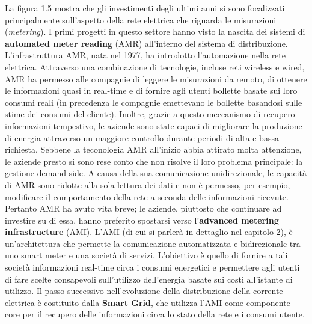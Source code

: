 La figura 1.5 mostra che gli investimenti degli ultimi anni si sono focalizzati principalmente sull'aspetto della rete elettrica che riguarda le misurazioni (\textit{metering}). \newline I primi progetti in questo settore hanno visto la nascita dei sistemi di \textbf{automated meter reading} (AMR) all'interno del sistema di distribuzione. \newline
L'infrastruttura AMR, nata nel 1977, ha introdotto l'automazione nella rete elettrica. Attraverso una combinazione di tecnologie, incluse reti wireless e wired,   AMR ha permesso alle compagnie di leggere le misurazioni da remoto, di ottenere le informazioni quasi in real-time e di fornire agli utenti bollette basate sui loro consumi reali (in precedenza le compagnie emettevano le bollette basandosi sulle stime dei consumi del cliente).  \newline Inoltre, grazie a questo meccanismo di recupero informazioni tempestivo, le aziende sono state capaci di migliorare la produzione di energia attraverso un maggiore controllo durante periodi di alta e bassa richiesta. \newline \newline
Sebbene la teconologia AMR all'inizio abbia attirato molta attenzione, le aziende presto si sono rese conto che non risolve il loro problema principale: la gestione demand-side. A causa della sua comunicazione unidirezionale, le capacità di AMR sono ridotte alla sola lettura dei dati e non è permesso, per esempio, modificare il comportamento della rete a seconda delle informazioni ricevute. \newline Pertanto AMR ha avuto vita breve; le aziende, piuttosto che continuare ad investire su di essa, hanno preferito spostarsi verso l'\textbf{advanced metering infrastructure} (AMI). \newline
L'AMI (di cui si parlerà in dettaglio nel capitolo 2), è un'architettura che permette la comunicazione automatizzata e bidirezionale tra uno smart meter e una società di servizi. L'obiettivo è quello di fornire a tali società informazioni real-time circa i consumi energetici e permettere agli utenti di fare scelte consapevoli sull'utilizzo dell'energia basate sui costi all'istante di utilizzo.
\newline
\newline
Il passo successivo nell'evoluzione della distribuzione della corrente elettrica è costituito dalla \textbf{Smart Grid}, che utilizza l'AMI come componente core per il recupero delle informazioni circa lo stato della rete e i consumi utente.
\newpage

